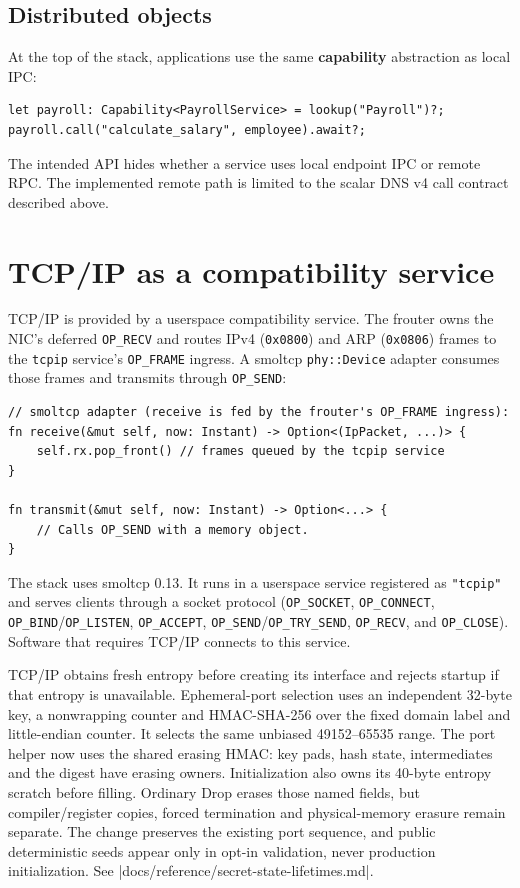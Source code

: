 \subsection{Distributed objects}

At the top of the stack, applications use the same \textbf{capability}
abstraction as local IPC:

\begin{lstlisting}[style=rustCode]
let payroll: Capability<PayrollService> = lookup("Payroll")?;
payroll.call("calculate_salary", employee).await?;
\end{lstlisting}

The intended API hides whether a service uses local endpoint IPC or remote RPC.
The implemented remote path is limited to the scalar DNS v4 call contract
described above.

\section{TCP/IP as a compatibility service}

TCP/IP is provided by a userspace compatibility service. The frouter owns the
NIC's deferred \texttt{OP\_RECV} and routes IPv4 (\texttt{0x0800}) and ARP
(\texttt{0x0806}) frames to the \texttt{tcpip} service's \texttt{OP\_FRAME}
ingress. A smoltcp \texttt{phy::Device} adapter consumes those frames and
transmits through \texttt{OP\_SEND}:

\begin{lstlisting}[style=rustCode]
// smoltcp adapter (receive is fed by the frouter's OP_FRAME ingress):
fn receive(&mut self, now: Instant) -> Option<(IpPacket, ...)> {
    self.rx.pop_front() // frames queued by the tcpip service
}

fn transmit(&mut self, now: Instant) -> Option<...> {
    // Calls OP_SEND with a memory object.
}
\end{lstlisting}

The stack uses smoltcp 0.13. It runs in a userspace service registered as
\texttt{"tcpip"} and serves clients through a socket protocol
(\texttt{OP\_SOCKET}, \texttt{OP\_CONNECT},
\texttt{OP\_BIND}/\texttt{OP\_LISTEN}, \texttt{OP\_ACCEPT}, \texttt{OP\_SEND}/\texttt{OP\_TRY\_SEND},
\texttt{OP\_RECV}, and \texttt{OP\_CLOSE}). Software that requires
TCP/IP connects to this service.

TCP/IP obtains fresh entropy before creating its interface and rejects startup
if that entropy is unavailable. Ephemeral-port selection uses an independent
32-byte key, a nonwrapping counter and HMAC-SHA-256 over the fixed domain label
and little-endian counter. It selects the same unbiased 49152--65535 range.
The port helper now uses the shared erasing HMAC: key pads, hash state,
intermediates and the digest have erasing owners. Initialization also owns its
40-byte entropy scratch before filling. Ordinary Drop erases those named fields, but
compiler/register copies, forced termination and physical-memory erasure remain
separate. The change preserves the existing port sequence, and public deterministic
seeds appear only in opt-in validation, never production initialization. See
\repofile|docs/reference/secret-state-lifetimes.md|.

